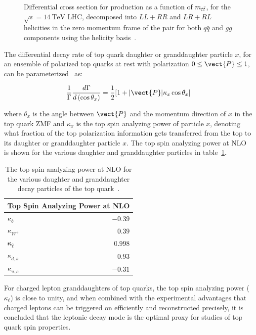 \begin{refsection}
\begin{figure}[htb]
\begin{center}
\begin{tabular}{c}
    \end{tabular}
    \caption{Differential cross section for \ttbar production as a function of $m_{t\bar{t}}$, for the $\sqrt{s}=\SI{14}{\TeV}$ LHC, decomposed into $L L + R R$ and $L R + R L$ helicities in the zero momentum frame of the \ttbar pair for both $q\bar{q}$ and $gg$ components using the helicity basis~\cite{PhysRevD.53.4886}.
            }
    \label{LHC_ttbar_helicity_differential}
  \end{center}
\end{figure}

The differential decay rate of top quark daughter or granddaughter particle $x$, for an ensemble of polarized top quarks at rest with polarization $0 \leq \vect{P} \leq 1$, can be parameterized~\cite{BRANDENBURG2002235} as:
\begin{linenomath*}
\begin{align}
\frac{1}{\Gamma} \frac{d \Gamma}{d\left(\cos \theta_x\right)}=\frac{1}{2}[1+ \vert \vect{P} \vert \kappa_x \cos \theta_x]
\end{align}
\end{linenomath*}
where $\theta_x$ is the angle between $\vect{P}$ and the momentum direction of $x$ in the top quark ZMF and $\kappa_x$ is the top spin analyzing power of particle $x$, denoting what fraction of the top polarization information gets transferred from the top to its daughter or granddaughter particle $x$.
The top spin analyzing power at NLO is shown for the various daughter and granddaughter particles in table~\ref{spin_analyzing_power_NLO}.
\begin{table}[htb]
\caption{The top spin analyzing power at NLO for the various daughter and granddaughter decay particles of the top quark~\cite{BRANDENBURG2002235}.
         }
\vspace*{6pt}
\begin{center}
\begin{tabular}{lr}
\multicolumn{2}{c}{ Top Spin Analyzing Power at NLO } \\
\hline$\kappa_b$ & $-0.39$ \\
$\kappa_{W^{+}}$ & $0.39$ \\
$\boldsymbol{\kappa}_{\bar{\ell}}$ & $\mathbf{0.998}$ \\
$\kappa_{\bar{d}, \bar{s}}$ & $0.93$ \\
$\kappa_{u, c}$ & $-0.31$
\end{tabular}
\label{spin_analyzing_power_NLO}
\end{center}
\end{table}
For charged lepton granddaughters of top quarks, the top spin analyzing power ($\kappa_\ell$) is close to unity, and when combined with the experimental advantages that charged leptons can be triggered on efficiently and reconstructed precisely, it is concluded that the leptonic decay mode is the optimal proxy for studies of top quark spin properties.


\end{refsection}
